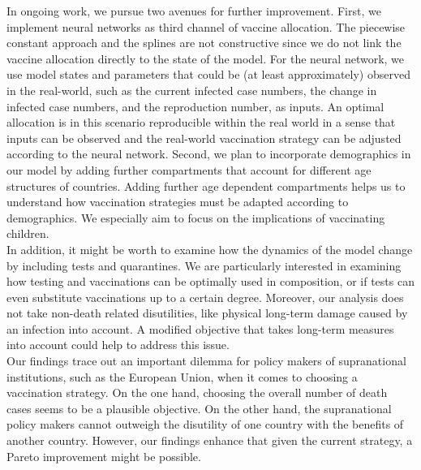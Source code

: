 In ongoing work, we pursue two avenues for further improvement. First, we implement neural networks as third channel of vaccine allocation. The piecewise constant approach and the splines are not constructive since we do not link the vaccine allocation directly to the state of the model. For the neural network, we use model states and parameters that could be (at least approximately) observed in the real-world, such as the current infected case numbers, the change in infected case numbers, and the reproduction number, as inputs. An optimal allocation is in this scenario reproducible within the real world in a sense that inputs can be observed and the real-world vaccination strategy can be adjusted according to the neural network. Second, we plan to incorporate demographics in our model by adding further compartments that account for different age structures of countries. Adding further age dependent compartments helps us to understand how vaccination strategies must be adapted according to demographics. We especially aim to focus on the implications of vaccinating children.  \\




In addition, it might be worth to examine how the dynamics of the model change by including tests and quarantines. We are particularly interested in examining how testing and vaccinations can be optimally  used in composition, or if tests can even substitute vaccinations up to a certain degree. Moreover, our analysis does not take non-death related disutilities, like physical long-term damage caused by an infection into account. A modified objective that takes long-term measures into account could help to address this issue. \\




Our findings trace out an important dilemma for policy makers of supranational institutions, such as the European Union, when it comes to choosing a vaccination strategy. On the one hand, choosing the overall number of death cases seems to be a plausible objective. On the other hand, the supranational policy makers cannot outweigh the disutility of one country with the benefits of another country. However, our findings enhance that given the current strategy, a Pareto improvement might be possible.  



